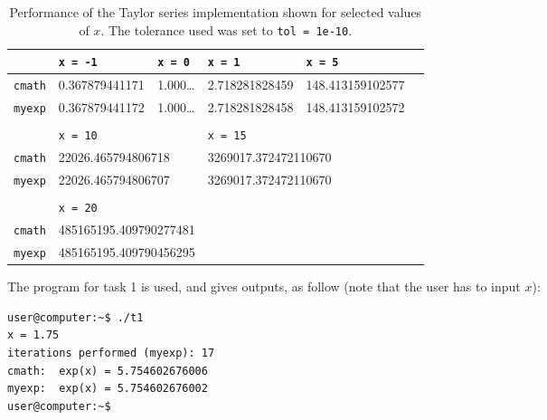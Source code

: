 \documentclass[a4paper,10pt]{article}
\begin{document}
\begin{table}[!ht]
\centering 
  \begin{minipage}[t]{105mm}
    \caption{
      Performance of the Taylor series implementation shown for selected values of 
      $x$. The tolerance used was set to \texttt{tol = 1e-10}. 
    } 
    \label{TABtask1}
  \end{minipage}

  \vspace{5mm}
  \begin{tabular}{l l l l l l} 
    \texttt{ }&\texttt{x = -1}& \texttt{x = 0} & \texttt{x = 1} & \texttt{x = 5} & \\
    \hline
    \texttt{cmath}	& 0.367879441171 & 1.000\dots & 2.718281828459 & 148.413159102577 \\
    \texttt{myexp}	& 0.367879441172 & 1.000\dots & 2.718281828458 & 148.413159102572 \\
    \vspace{-2mm} \\ \hline
    \texttt{ }& \multicolumn{2}{l}{\texttt{x = 10}} & \multicolumn{2}{l}{\texttt{x = 15}} \\
    \texttt{cmath}	& \multicolumn{2}{l}{22026.465794806718} & 
    \multicolumn{2}{l}{3269017.372472110670}\\
    \texttt{myexp}	& \multicolumn{2}{l}{22026.465794806707} & 
    \multicolumn{2}{l}{3269017.372472110670}\\
     \vspace{-2mm} \\ \hline
    \texttt{ }& \multicolumn{2}{l}{\texttt{x = 20}} & \\
    \texttt{cmath}	& \multicolumn{2}{l}{485165195.409790277481} \\
    \texttt{myexp}	& \multicolumn{2}{l}{485165195.409790456295} \\
  \end{tabular}
\end{table}


\noindent
The program for task 1 is used, and gives outputs, as follow (note that the user has to input $x$):
\begin{center}
\begin{minipage}[t]{85mm}
\begin{lstlisting}
user@computer:~$ ./t1 
x = 1.75
iterations performed (myexp): 17
cmath:  exp(x) = 5.754602676006
myexp:  exp(x) = 5.754602676002
user@computer:~$ 
\end{lstlisting}
\end{minipage}
\end{center}
\end{document}
